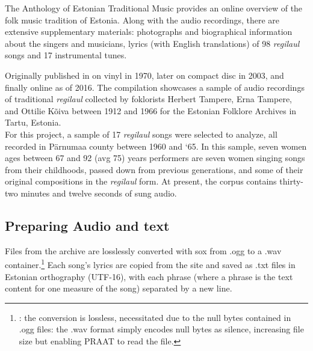 \documentclass[12pt]{article}
\begin{document}
The Anthology of Estonian Traditional Music\cite{tampereAnthologyEstonianTraditional} provides an online overview of the folk music tradition of Estonia.  Along with the audio recordings, there are extensive supplementary materials: photographs and biographical information about the singers and musicians, lyrics (with English translations) of 98 {\it regilaul} songs and 17 instrumental tunes.

Originally published in on vinyl in 1970, later on compact disc in 2003, and finally  online as of 2016. The compilation showcases a sample of audio recordings of traditional {\it regilaul} collected by foklorists Herbert Tampere, Erna Tampere, and Ottilie Kõiva between 1912 and 1966 for the Estonian Folklore Archives in Tartu, Estonia. \\
For this project, a sample of 17 {\it regilaul} songs were selected to analyze, all recorded in Pärnumaa county between 1960 and  `65. 
 In this sample, seven women  ages between 67 and 92 (avg 75) years
 performers are seven women singing songs from their childhoods, passed down from previous generations, and some of their original compositions in the {\it regilaul} form.  At present, the corpus contains thirty-two minutes and twelve seconds of sung audio.

\subsection*{Preparing Audio and text} 
Files from the archive are losslessly converted with sox \cite{SoXSoundExchange} from .ogg to a .wav container.\footnote{: the conversion is lossless, necessitated due to the null bytes contained in .ogg files: the .wav format simply encodes null bytes as silence, increasing file size but enabling PRAAT\cite{boersnaPraatDoingPhonetics2022} to read the file.} Each song's lyrics are copied from the site and saved as .txt files in Estonian orthography (UTF-16), with each phrase (where a phrase is the text content for one measure of the song) separated by a new line. 
\end{document}
